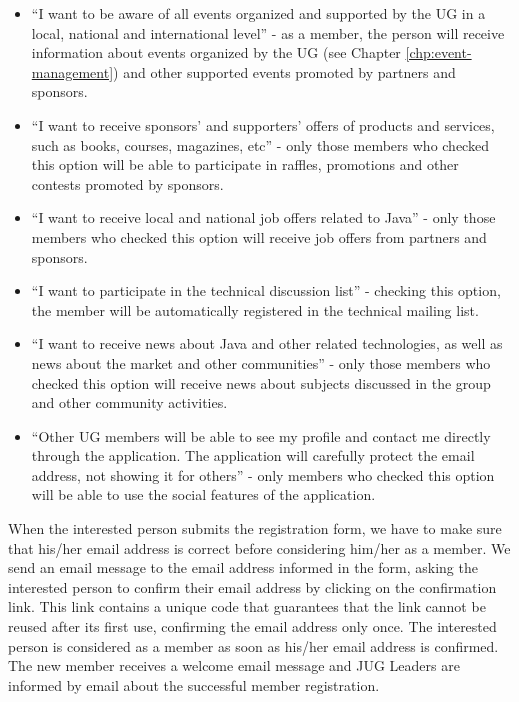 \documentclass[envcountsame,envcountchap]{svmono}
\begin{document}
\begin{itemize}
\item ``I want to be aware of all events organized and supported by the UG in a local, national and international level'' - as a member, the person will receive information about events organized by the UG (see Chapter \ref{chp:event-management}) and other supported events promoted by partners and sponsors.

\item ``I want to receive sponsors' and supporters' offers of products and services, such as books, courses, magazines, etc'' - only those members who checked this option will be able to participate in raffles, promotions and other contests promoted by sponsors.

\item ``I want to receive local and national job offers related to Java'' - only those members who checked this option will receive job offers from partners and sponsors.

\item ``I want to participate in the technical discussion list'' - checking this option, the member will be automatically registered in the technical mailing list.

\item ``I want to receive news about Java and other related technologies, as well as news about the market and other communities'' - only those members who checked this option will receive news about subjects discussed in the group and other community activities.

\item ``Other UG members will be able to see my profile and contact me directly through the application. The application will carefully protect the email address, not showing it for others'' - only members who checked this option will be able to use the social features of the application.
\end{itemize}

When the interested person submits the registration form, we have to make sure that his/her email address is correct before considering him/her as a member. We send an email message to the email address informed in the form, asking the interested person to confirm their email address by clicking on the confirmation link. This link contains a unique code that guarantees that the link cannot be reused after its first use, confirming the email address only once. The interested person is considered as a member as soon as his/her email address is confirmed. The new member receives a welcome email message and JUG Leaders are informed by email about the successful member registration.
\end{document}
